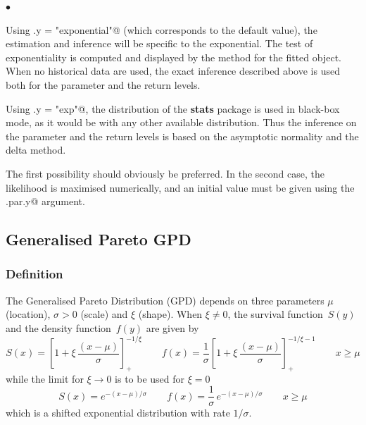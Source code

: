 \documentclass[a4paper]{report}
\newcommand{\pkg}[1]{\textbf{#1}}
\begin{document}
\begin{list}{$\bullet$}{ }
\item Using \verb@distname.y = "exponential"@
  (which corresponds to the default value), the estimation 
  and inference will be specific to the exponential. The test of exponentiality 
  is computed and displayed by the \verb@summary@ method for the fitted object. 
  When no historical data are used, the exact inference described above is used
  both for the parameter and the return levels.
\item Using \verb@distname.y = "exp"@, the distribution of the \pkg{stats} package 
  is used in black-box mode, as it would be with any other available distribution. Thus 
  the inference on the parameter and the return levels is based on the asymptotic
  normality and the delta method. 
\end{list}
The first possibility should obviously be preferred. In the second case, 
the likelihood is maximised numerically, and an initial value must be given 
using the \verb@start.par.y@ argument.



\subsection{Generalised Pareto GPD}
\label{GPDdist}

\subsubsection*{Definition}
The Generalised Pareto Distribution (GPD) depends on three parameters $\mu$ (location),
$\sigma>0$ (scale) and $\xi$ (shape). When $\xi \neq 0$, the survival function~$S(y)$
and the density function~$f(y)$ are given by 
\begin{equation}
  \label{eq:defGPD}
  S(x) = \left[ 1 + \xi \,\frac{(x-\mu)}{\sigma} \right]_{+}^{-1/\xi}
  \qquad
  f(x) = \frac{1}{\sigma} \left[ 1 + \xi \,\frac{(x-\mu)}{\sigma} \right]_{+}^{-1/\xi -1}  
  \qquad x \geqslant \mu
\end{equation}
while the limit for $\xi \rightarrow 0$ is to be used for $\xi=0$
$$
   S(x) = e^{-(x-\mu)/\sigma} 
   \qquad 
   f(x) = \frac{1}{\sigma} \,e^{-(x-\mu)/\sigma}
  \qquad x \geqslant \mu
$$ 
which is a shifted exponential distribution with rate $1/\sigma$.
     
\end{document}

